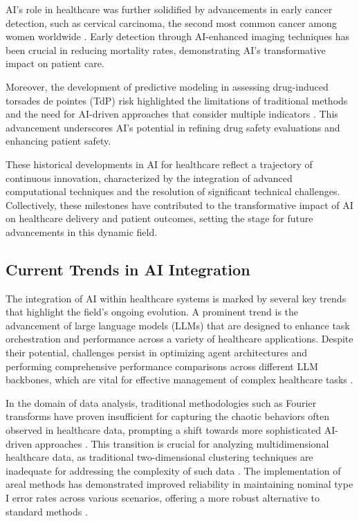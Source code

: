 AI's role in healthcare was further solidified by advancements in early cancer detection, such as cervical carcinoma, the second most common cancer among women worldwide \cite{tumer1999ensemblesradialbasisfunction}. Early detection through AI-enhanced imaging techniques has been crucial in reducing mortality rates, demonstrating AI's transformative impact on patient care.



Moreover, the development of predictive modeling in assessing drug-induced torsades de pointes (TdP) risk highlighted the limitations of traditional methods and the need for AI-driven approaches that consider multiple indicators \cite{xi2022statisticallearningpreclinicaldrug}. This advancement underscores AI's potential in refining drug safety evaluations and enhancing patient safety.



These historical developments in AI for healthcare reflect a trajectory of continuous innovation, characterized by the integration of advanced computational techniques and the resolution of significant technical challenges. Collectively, these milestones have contributed to the transformative impact of AI on healthcare delivery and patient outcomes, setting the stage for future advancements in this dynamic field.



\subsection{Current Trends in AI Integration} \label{subsec:Current Trends in AI Integration}



The integration of AI within healthcare systems is marked by several key trends that highlight the field's ongoing evolution. A prominent trend is the advancement of large language models (LLMs) that are designed to enhance task orchestration and performance across a variety of healthcare applications. Despite their potential, challenges persist in optimizing agent architectures and performing comprehensive performance comparisons across different LLM backbones, which are vital for effective management of complex healthcare tasks .



In the domain of data analysis, traditional methodologies such as Fourier transforms have proven insufficient for capturing the chaotic behaviors often observed in healthcare data, prompting a shift towards more sophisticated AI-driven approaches \cite{boull2019classificationchaotictimeseries}. This transition is crucial for analyzing multidimensional healthcare data, as traditional two-dimensional clustering techniques are inadequate for addressing the complexity of such data \cite{tait2020clusteringhigherorderdata}. The implementation of areal methods has demonstrated improved reliability in maintaining nominal type I error rates across various scenarios, offering a more robust alternative to standard methods \cite{vidanapathirana2022clusterdetectioncapabilitiesaverage}.



